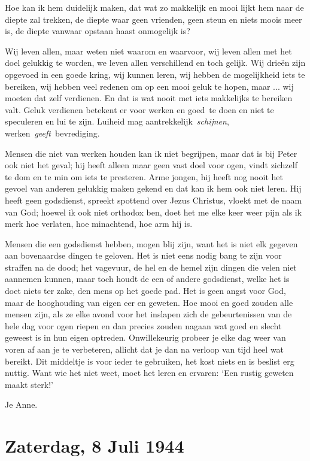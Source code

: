 \documentclass{book}
\begin{document}
Hoe kan ik hem duidelijk maken, dat wat zo makkelijk en mooi lijkt hem
naar de diepte zal trekken, de diepte waar geen vrienden, geen steun en
niets moois meer is, de diepte vanwaar opstaan haast onmogelijk is?

Wij leven allen, maar weten niet waarom en waarvoor, wij leven allen met
het doel gelukkig te worden, we leven allen verschillend en toch gelijk.
Wij drieën zijn opgevoed in een goede kring, wij kunnen leren, wij
hebben de mogelijkheid iets te bereiken, wij hebben veel redenen om op
een mooi geluk te hopen, maar ... wij moeten dat zelf verdienen. En dat
is wat nooit met iets makkelijks te bereiken valt. Geluk verdienen
betekent er voor werken en goed~te doen en niet te speculeren en lui te
zijn. Luiheid mag aantrekkelijk~\emph{schijnen},
werken~\emph{geeft}~bevrediging.

Mensen die niet van werken houden kan ik niet begrijpen, maar dat is bij
Peter ook niet het geval; hij heeft alleen maar geen vast doel voor
ogen, vindt zichzelf te dom en te min om iets te presteren. Arme jongen,
hij heeft nog nooit het gevoel van anderen gelukkig maken gekend en dat
kan ik hem ook niet leren. Hij heeft geen godsdienst, spreekt spottend
over Jezus Christus, vloekt met de naam van God; hoewel ik ook niet
orthodox ben, doet het me elke keer weer pijn als ik merk hoe verlaten,
hoe minachtend, hoe arm hij is.

Mensen die een godsdienst hebben, mogen blij zijn, want het is niet elk
gegeven aan bovenaardse dingen te geloven. Het is niet eens nodig bang
te zijn voor straffen na de dood; het vagevuur, de hel en de hemel zijn
dingen die velen niet aannemen kunnen, maar toch houdt de een of andere
godsdienst, welke het is doet niets ter zake, den mens op het goede pad.
Het is geen angst voor God, maar de hooghouding van eigen eer en
geweten. Hoe mooi en goed zouden alle mensen zijn, als ze elke avond
voor het inslapen zich de gebeurtenissen van de hele dag voor ogen
riepen en dan precies zouden nagaan wat goed en slecht geweest is in hun
eigen optreden. Onwillekeurig probeer je elke dag weer van voren af aan
je te verbeteren, allicht dat je dan na verloop van tijd heel wat
bereikt. Dit middeltje is voor ieder te gebruiken, het kost niets en is
beslist erg nuttig. Want wie het niet weet, moet het leren en ervaren:
`Een rustig geweten maakt sterk!'

Je Anne.

\chapter{Zaterdag, 8 Juli 1944}
\end{document}

